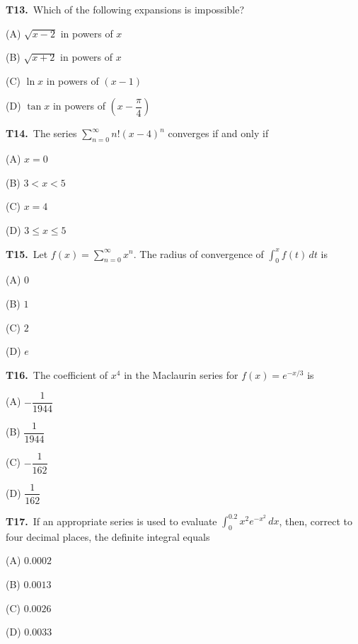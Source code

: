 \documentclass[11pt]{article}
\begin{document}
\bigskip\noindent\textbf{T13.}\ Which of the following expansions is impossible?
\begin{list}{}{\setlength{\leftmargin}{3em}\setlength{\labelwidth}{2.5em}\setlength{\itemsep}{0pt}\setlength{\topsep}{2pt}}
\item[(A)] $\sqrt{x-2}$ in powers of $x$
\item[(B)] $\sqrt{x+2}$ in powers of $x$
\item[(C)] $\ln x$ in powers of $(x-1)$
\item[(D)] $\tan x$ in powers of $\left(x-\dfrac{\pi}{4}\right)$
\end{list}

\bigskip\noindent\textbf{T14.}\ The series $\displaystyle\sum_{n=0}^\infty n!(x-4)^n$ converges if and only if
\begin{list}{}{\setlength{\leftmargin}{3em}\setlength{\labelwidth}{2.5em}\setlength{\itemsep}{0pt}\setlength{\topsep}{2pt}}
\item[(A)] $x=0$
\item[(B)] $3<x<5$
\item[(C)] $x=4$
\item[(D)] $3\leq x\leq 5$
\end{list}

\bigskip\noindent\textbf{T15.}\ Let $f(x)=\displaystyle\sum_{n=0}^\infty x^n$. The radius of convergence of $\displaystyle\int_0^x f(t)\,dt$ is
\begin{list}{}{\setlength{\leftmargin}{3em}\setlength{\labelwidth}{2.5em}\setlength{\itemsep}{0pt}\setlength{\topsep}{2pt}}
\item[(A)] $0$
\item[(B)] $1$
\item[(C)] $2$
\item[(D)] $e$
\end{list}

\bigskip\noindent\textbf{T16.}\ The coefficient of $x^4$ in the Maclaurin series for $f(x)=e^{-x/3}$ is
\begin{list}{}{\setlength{\leftmargin}{3em}\setlength{\labelwidth}{2.5em}\setlength{\itemsep}{0pt}\setlength{\topsep}{2pt}}
\item[(A)] $-\dfrac{1}{1944}$
\item[(B)] $\dfrac{1}{1944}$
\item[(C)] $-\dfrac{1}{162}$
\item[(D)] $\dfrac{1}{162}$
\end{list}

\bigskip\noindent\textbf{T17.}\ If an appropriate series is used to evaluate $\displaystyle\int_0^{0.2} x^2 e^{-x^2}\,dx$, then, correct to four decimal places, the definite integral equals
\begin{list}{}{\setlength{\leftmargin}{3em}\setlength{\labelwidth}{2.5em}\setlength{\itemsep}{0pt}\setlength{\topsep}{2pt}}
\item[(A)] $0.0002$
\item[(B)] $0.0013$
\item[(C)] $0.0026$
\item[(D)] $0.0033$
\end{list}
\end{document}
